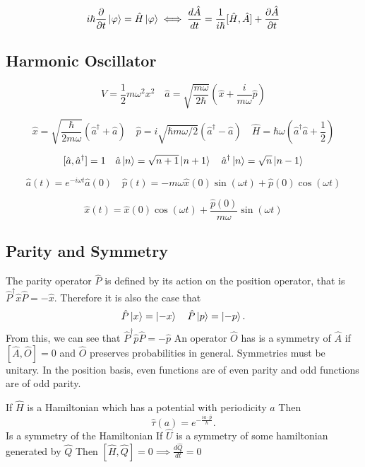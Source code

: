 \documentclass{article}
\begin{document}
    \[
      i \hbar \frac{\partial}{\partial t} \ket{\varphi} = \hat{H} \ket{\varphi} 
      \iff \frac{d \hat{A}}{dt} = \frac{1}{i \hbar}[\hat{H},\hat{A}] + 
      \frac{\partial \hat{A}}{\partial t} 
    \]
    \subsection*{Harmonic Oscillator} 
      \[
        V = \frac{1}{2} m \omega^2 x^2 \quad 
        \hat{a} = \sqrt{\frac{m \omega}{2 \hbar}}( \hat{x} + \frac{i}{m \omega}\hat{p})
      \]

      \[
        \hat{x} = \sqrt{\frac{\hbar}{2 m \omega}}(\hat{a}^\dagger + \hat{a}) \quad
        \hat{p} = i \sqrt{\hbar m \omega /2 }(\hat{a}^\dagger - \hat{a}) \quad
        \hat{H} = \hbar \omega(\hat{a}^\dagger\hat{a} + \frac{1}{2})
      \]
  
      \[
        [\hat{a},\hat{a}^\dagger] = 1 \quad
        \hat{a} \ket{n} = \sqrt{n + 1} \ket{n+1} \quad
        \hat{a}^\dagger \ket{n} = \sqrt{n}\ket{n-1}
      \]
  
      \[
        \hat{a}(t) = e^{-i \omega t}\hat{a}(0) \quad 
        \hat{p}(t) = - m \omega \hat{x}(0) \sin(\omega t) + \hat{p}(0) \cos(\omega t) 
      \]
    
      \[
        \hat{x}(t) = \hat{x}(0) \cos(\omega t) + \frac{\hat{p}(0)}{m \omega }\sin(\omega t)
      \]
    \subsection*{Parity and Symmetry}    
      The parity operator $\hat{P}$ is defined by its action on the position 
      operator, that is  $\hat{P}^\dagger \hat{x} \hat{P} = - \hat{x}$. Therefore
      it is also the case that \[
        \hat{P}\ket{x} = \ket{-x}  \quad \hat{P}\ket{p} = \ket{-p}
      .\] 
      From this, we can see that $\hat{P}^{\dagger}\hat{p}\hat{P} = -\hat{p}$ 
      An operator $\hat{O}$ has is a symmetry of $\hat{A}$ if 
      $[\hat{A},\hat{O}]=0$ and $\hat{O}$ preserves probabilities in general.
      Symmetries must be unitary.
      In the position basis, even functions are of even parity and odd 
      functions are of odd parity.
      
      If $\hat{H}$ is a Hamiltonian which has a potential with periodicity  $a$
      Then 
      \[
        \hat{\tau}(a) = e^{-\frac{i a \cdot \hat{p} }{\hbar}}
      .\]  
      Is a symmetry of the Hamiltonian 
      If $\hat{U}$ is a symmetry of some hamiltonian generated by  $\hat{Q}$
      Then  $[\hat{H},\hat{Q}] = 0 \implies \frac{d\hat{Q}}{dt} = 0$
\end{document}
